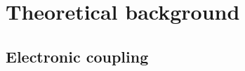 \chapter{Theoretical background}
\label{sec:theory}




\section{Electronic coupling}
\label{sec:transfer_integrals}






